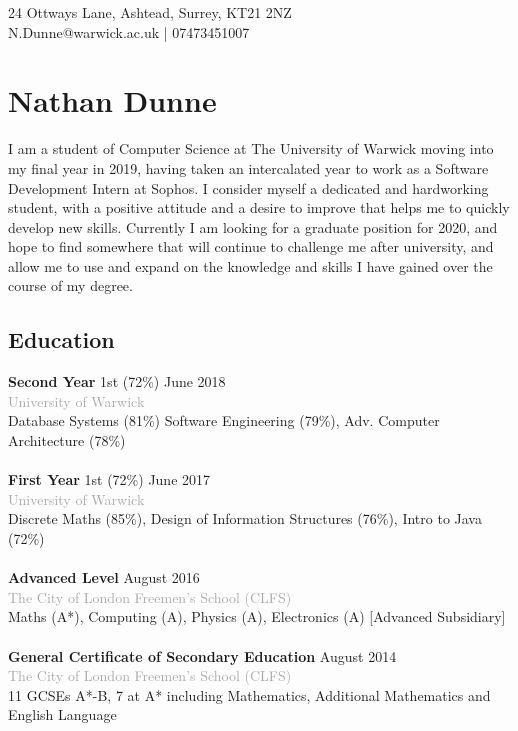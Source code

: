 \documentclass[11pt]{article}
\newcommand{\linesep}{\noindent\makebox[\linewidth]{\rule{\linewidth}{0.2pt}}}
\begin{document}
\hspace*{\fill} 24 Ottways Lane, Ashtead, Surrey, KT21 2NZ \\
\hspace*{\fill} N.Dunne@warwick.ac.uk | 07473451007
\section*{Nathan Dunne}

I am a student of Computer Science at The University of Warwick moving into my final year in 2019, having taken an intercalated year to work as a Software Development Intern at Sophos. I consider myself a dedicated and hardworking student, with a positive attitude and a desire to improve that helps me to quickly develop new skills. Currently I am looking for a graduate position for 2020, and hope to find somewhere that will continue to challenge me after university, and allow me to use and expand on the knowledge and skills I have gained over the course of my degree.

\linesep
\subsection*{Education}

\textbf{Second Year} \hfill 1st (72\%) \hfill June 2018 \\
\textcolor{darkgray}{University of Warwick} \\
\hspace*{4ex}Database Systems (81\%) Software Engineering (79\%), Adv. Computer Architecture (78\%)
\\\\
\textbf{First Year} \hfill \hspace{1em} 1st (72\%) \hfill June 2017 \\    
\textcolor{darkgray}{University of Warwick} \\
\hspace*{4ex}Discrete Maths (85\%), Design of Information Structures (76\%), Intro to Java (72\%)
\\\\
\textbf{Advanced Level} \hfill August 2016 \\
\textcolor{darkgray}{The City of London Freemen’s School (CLFS)} \\                    
\hspace*{4ex}Maths (A*), Computing (A), Physics (A), Electronics (A) [Advanced Subsidiary]
\\\\
\textbf{General Certificate of Secondary Education} \hfill August 2014 \\
\textcolor{darkgray}{The City of London Freemen’s School (CLFS)} \\  
\hspace*{4ex}11 GCSEs A*-B, 7 at A* including Mathematics, Additional Mathematics and English Language
\\
 \linesep
\end{document}
